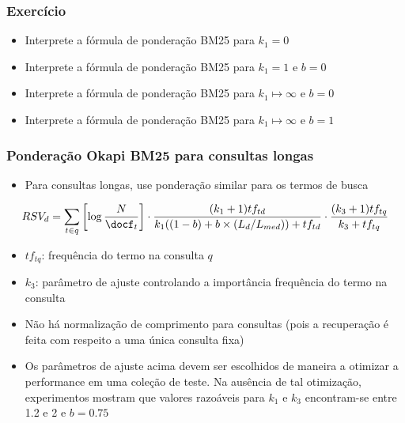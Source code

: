 \documentclass[compress]{beamer}
\def\myblue#1{\textcolor{texblue}{#1}}
\begin{document}
\begin{frame}
\frametitle{Exercício}
\pause[2]

\begin{itemize}
\item Interprete a fórmula de ponderação BM25 para $k_1 =0$ 
\item Interprete a fórmula de ponderação BM25 para $k_1 =1$ e $b=0$
\item Interprete a fórmula de ponderação BM25 para $k_1 \mapsto \infty$ e $b=0$
\item Interprete a fórmula de ponderação BM25 para $k_1 \mapsto \infty$ e $b=1$
\end{itemize}

\end{frame}




\begin{frame}[<+->]
\frametitle{Ponderação Okapi BM25 para consultas longas}
\pause[2]

\begin{itemize}
\item Para consultas longas, use ponderação similar para os termos de busca
\end{itemize}

\begin{equation}
\nonumber
RSV_d = \sum_{t\in q} \left[\log\frac{N}{\docf_t}\right]
\cdot
\frac{(k_1+1)tf_{td}}{k_1((1-b) + b \times (L_d/L_{med}))+tf_{td}}
\cdot
\frac{(k_3 + 1)tf_{tq}}{k_3 + tf_{tq}} \label{bm25-3}
\end{equation}
\begin{itemize}
\item $tf_{tq}$: frequência do termo na consulta $q$
\item $k_3$: parâmetro de ajuste controlando a importância frequência do termo na consulta

\item Não há normalização de comprimento para consultas (pois a recuperação é feita com respeito a uma única consulta fixa)

\item Os parâmetros de ajuste acima devem ser escolhidos de maneira a otimizar a performance  em uma coleção de teste. Na ausência de tal otimização, experimentos mostram que valores  razoáveis para $k_1$ e $k_3$ encontram-se entre  1.2 e 2 e $b = 0.75$
\end{itemize}

\end{frame}
\end{document}
